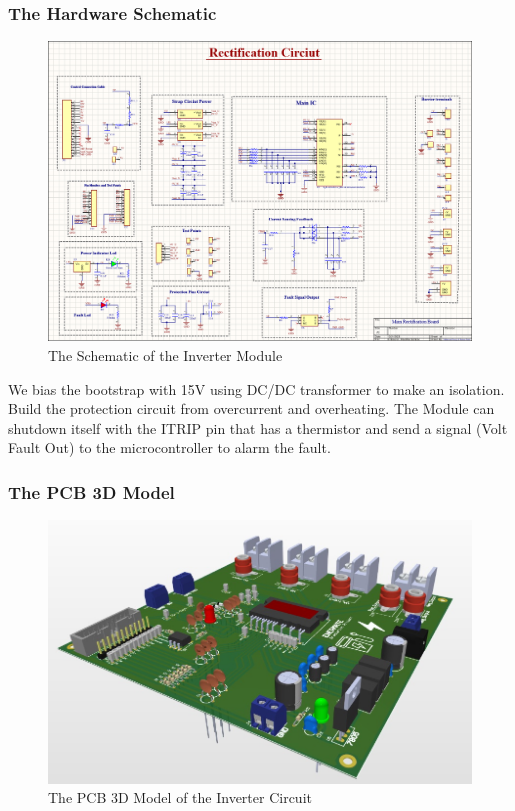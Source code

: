\documentclass[12pt,a4paper]{book}
\begin{document}
\subsubsection{The Hardware Schematic}
\begin{figure}[h!]
  \centering
  \includegraphics[width = 17cm]{image30.png}
  \caption{The Schematic of the Inverter Module}
  \label{fig:image30}
\end{figure}
We bias the bootstrap with 15V using DC/DC transformer to make an isolation. Build the protection circuit from overcurrent and overheating. The Module can shutdown itself with the ITRIP pin that has a thermistor and send a signal (Volt Fault Out) to the microcontroller to alarm the fault.

\subsubsection{The PCB 3D Model}
\begin{figure}[h!]
  \centering
  \includegraphics[width = 12cm]{image31.png}
  \caption{The PCB 3D Model of the Inverter Circuit}
  \label{fig:image31}
\end{figure}
\end{document}
